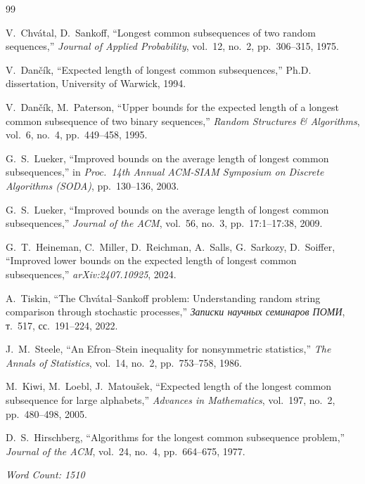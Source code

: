 \documentclass[12pt,a4paper]{article}
\begin{document}
\begin{thebibliography}{99}

V.~Chv\'{a}tal, D.~Sankoff,
``Longest common subsequences of two random sequences,''
\textit{Journal of Applied Probability}, vol.~12, no.~2, pp.~306--315, 1975.

V.~Dan\v{c}\'{i}k,
``Expected length of longest common subsequences,''
Ph.D. dissertation, University of Warwick, 1994.

V.~Dan\v{c}\'{i}k, M.~Paterson,
``Upper bounds for the expected length of a longest common subsequence of two binary sequences,''
\textit{Random Structures \& Algorithms}, vol.~6, no.~4, pp.~449--458, 1995.

G.~S.~Lueker,
``Improved bounds on the average length of longest common subsequences,''
in \textit{Proc.~14th Annual ACM-SIAM Symposium on Discrete Algorithms (SODA)}, pp.~130--136, 2003.

G.~S.~Lueker,
``Improved bounds on the average length of longest common subsequences,''
\textit{Journal of the ACM}, vol.~56, no.~3, pp.~17:1--17:38, 2009.

G.~T.~Heineman, C.~Miller, D.~Reichman, A.~Salls, G.~Sarkozy, D.~Soiffer,
``Improved lower bounds on the expected length of longest common subsequences,''
\textit{arXiv:2407.10925}, 2024.

A.~Tiskin,
``The Chv\'{a}tal--Sankoff problem: Understanding random string comparison through stochastic processes,''
\textit{Записки научных семинаров ПОМИ}, т.~517, сс.~191--224, 2022.

J.~M.~Steele,
``An {E}fron--{S}tein inequality for nonsymmetric statistics,''
\textit{The Annals of Statistics}, vol.~14, no.~2, pp.~753--758, 1986.

M.~Kiwi, M.~Loebl, J.~Matou\v{s}ek,
``Expected length of the longest common subsequence for large alphabets,''
\textit{Advances in Mathematics}, vol.~197, no.~2, pp.~480--498, 2005.

D.~S.~Hirschberg,
``Algorithms for the longest common subsequence problem,''
\textit{Journal of the ACM}, vol.~24, no.~4, pp.~664--675, 1977.

\end{thebibliography}

\bigskip
\noindent\textit{Word Count: 1510}
\end{document}
